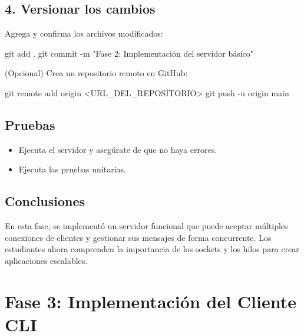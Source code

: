 \documentclass[
  a4paper,
  DIV=11,
  numbers=noendperiod,
  onepage,
  openany]{scrreprt}
\newenvironment{Shaded}{\begin{snugshade}}{\end{snugshade}}
\newcommand{\AttributeTok}[1]{\textcolor[rgb]{0.40,0.45,0.13}{#1}}
\newcommand{\FunctionTok}[1]{\textcolor[rgb]{0.28,0.35,0.67}{#1}}
\newcommand{\NormalTok}[1]{\textcolor[rgb]{0.00,0.23,0.31}{#1}}
\newcommand{\OperatorTok}[1]{\textcolor[rgb]{0.37,0.37,0.37}{#1}}
\newcommand{\StringTok}[1]{\textcolor[rgb]{0.13,0.47,0.30}{#1}}
\providecommand{\tightlist}{%
  \setlength{\itemsep}{0pt}\setlength{\parskip}{0pt}}\usepackage{longtable,booktabs,array}
\begin{document}
\section{4. Versionar los cambios}\label{versionar-los-cambios}

Agrega y confirma los archivos modificados:

\begin{Shaded}
\begin{Highlighting}[]
\FunctionTok{git}\NormalTok{ add .}
\FunctionTok{git}\NormalTok{ commit }\AttributeTok{{-}m} \StringTok{"Fase 2: Implementación del servidor básico"}
\end{Highlighting}
\end{Shaded}

(Opcional) Crea un repositorio remoto en GitHub:

\begin{Shaded}
\begin{Highlighting}[]
\FunctionTok{git}\NormalTok{ remote add origin }\OperatorTok{\textless{}}\NormalTok{URL\_DEL\_REPOSITORIO}\OperatorTok{\textgreater{}}
\FunctionTok{git}\NormalTok{ push }\AttributeTok{{-}u}\NormalTok{ origin main}
\end{Highlighting}
\end{Shaded}

\section{Pruebas}\label{pruebas-1}

\begin{itemize}
\tightlist
\item
  Ejecuta el servidor y asegúrate de que no haya errores.
\item
  Ejecuta las pruebas unitarias.
\end{itemize}

\section{Conclusiones}\label{conclusiones-14}

En esta fase, se implementó un servidor funcional que puede aceptar
múltiples conexiones de clientes y gestionar sus mensajes de forma
concurrente. Los estudiantes ahora comprenden la importancia de los
sockets y los hilos para crear aplicaciones escalables.

\chapter{Fase 3: Implementación del Cliente
CLI}\label{fase-3-implementaciuxf3n-del-cliente-cli}
\end{document}
